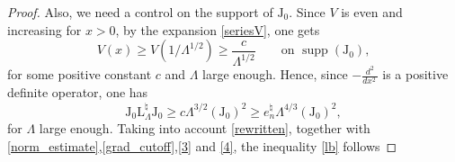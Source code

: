\documentclass[a4paper,11pt,reqno]{amsart}
\theoremstyle{definition}
\numberwithin{equation}{section}
\newcommand{\Lrm}{\mathrm{L}}
\newcommand{\supp}{\operatorname{supp}}
\newcommand{\bosfer}{{\natural}}
\begin{document}
\begin{proof}
Also, we need a control on the support of $\mathrm{J_0}$. Since $V$ is even and increasing for $x>0$, by the expansion \eqref{seriesV}, one gets
\[
V(x) \geq V(1/\Lambda^{1/2}) \geq  \frac{c}{\Lambda^{1/2}} \qquad\text{on $\supp(\mathrm{J_0})$},
\]
for some positive constant $c$ and  $\Lambda$ large enough. Hence, since $-\frac{d^{2} }{dx^{2}\,} $ is a positive definite operator, one has
\begin{equation}\label{4}
\mathrm{J_0} \Lrm^{\bosfer}_\Lambda  \mathrm{J_0} \geq c \Lambda^{3/2} \left(\mathrm{J_0}\right)^2 \geq e^\bosfer_{n} \Lambda^{4/3} \left(\mathrm{J_0}\right)^2 ,
\end{equation}
for $\Lambda$ large enough. Taking into account \eqref{rewritten}, together with  \eqref{norm_estimate},\eqref{grad_cutoff},\eqref{3} and \eqref{4}, the inequality \eqref{lb} follows   
\end{proof}
\end{document}
